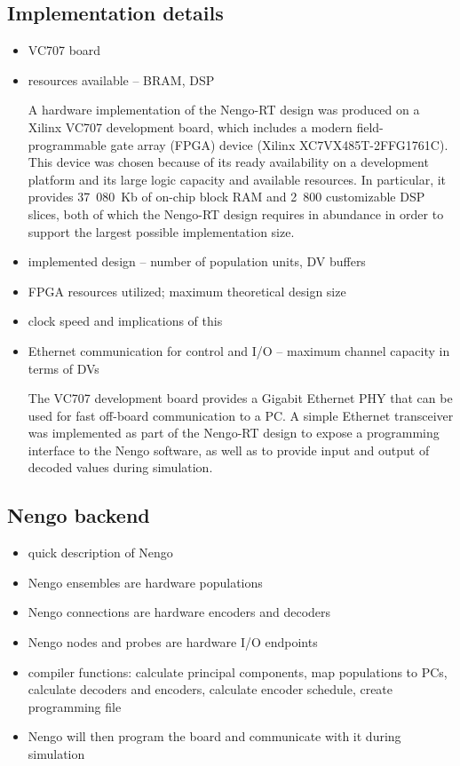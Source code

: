 \documentclass[english]{article}
\begin{document}
\subsection{Implementation details}

\begin{itemize}
\item VC707 board
\item resources available -- BRAM, DSP

A hardware implementation of the Nengo-RT design was produced on a Xilinx VC707 development board, which includes a modern field-programmable gate array (FPGA)
device (Xilinx XC7VX485T-2FFG1761C). This device was chosen because of its ready availability on a development platform and its large logic capacity and available resources.
In particular, it provides 37~080~Kb of on-chip block RAM and 2~800 customizable DSP slices, both of which the Nengo-RT design requires in abundance in order to support
the largest possible implementation size. 

\item implemented design -- number of population units, DV buffers

\item FPGA resources utilized; maximum theoretical design size
\item clock speed and implications of this
\item Ethernet communication for control and I/O -- maximum channel capacity in terms of DVs

The VC707 development board provides a Gigabit Ethernet PHY that can be used for fast off-board communication to a PC.
A simple Ethernet transceiver was implemented as part of the Nengo-RT design to expose a programming interface to the Nengo software,
as well as to provide input and output of decoded values during simulation.

\end{itemize}

\subsection{Nengo backend}

\begin{itemize}
\item quick description of Nengo
\item Nengo ensembles are hardware populations
\item Nengo connections are hardware encoders and decoders
\item Nengo nodes and probes are hardware I/O endpoints
\item compiler functions: calculate principal components, map populations to PCs, calculate decoders and encoders,
calculate encoder schedule, create programming file
\item Nengo will then program the board and communicate with it during simulation
\end{itemize}
\end{document}
